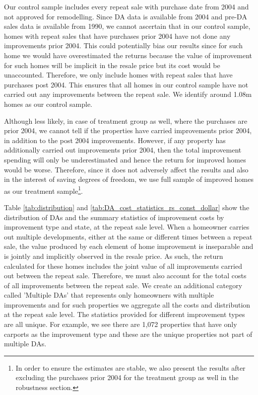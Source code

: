 \documentclass[AEJ,reqno, draftmode]{AEA} %
\begin{document}
Our control sample includes every repeat sale with purchase date from 2004 and not approved for remodelling. Since DA data is available from 2004 and pre-DA sales data is available from 1990, we cannot ascertain that in our control sample, homes with repeat sales that have purchases prior 2004 have not done any improvements prior 2004. This could potentially bias our results since for such home we would have overestimated the returns because the value of improvement for such homes will be implicit in the resale price but its cost would be unaccounted. Therefore, we only include homes with repeat sales that have purchases post 2004. This ensures that all homes in our control sample have not carried out any improvements between the repeat sale. We identify around 1.08m homes as our control sample.

Although less likely, in case of treatment group as well, where the purchases are prior 2004, we cannot tell if the properties have carried improvements prior 2004, in addition to the post 2004 improvements. However, if any property has additionally carried out improvements prior 2004, then the total improvement spending will only be underestimated and hence the return for improved homes would be worse. Therefore, since it does not adversely affect the results and also in the interest of saving degrees of freedom, we use full sample of improved homes as our treatment sample\footnote{In order to ensure the estimates are stable, we also present the results after excluding the purchases prior 2004 for the treatment group as well in the robustness section.}.


%

Table \ref{tab:distribution} and \ref{tab:DA_cost_statistics_rs_const_dollar} show the distribution of DAs and the summary statistics of improvement costs by improvement type and state, at the repeat sale level. When a homeowner carries out multiple developments, either at the same or different times between a repeat sale, the value produced by each element of home improvement is inseparable and is jointly and implicitly observed in the resale price. As such, the return calculated for these homes includes the joint value of all improvements carried out between the repeat sale. Therefore, we must also account for the total costs of all improvements between the repeat sale. We create an additional category called 'Multiple DAs' that represents only homeowners with multiple improvements and for such properties we aggregate all the costs and distribution at the repeat sale level. The statistics provided for different improvement types are all unique. For example, we see there are 1,072 properties that have only carports as the improvement type and these are the unique properties not part of multiple DAs.
\end{document}
